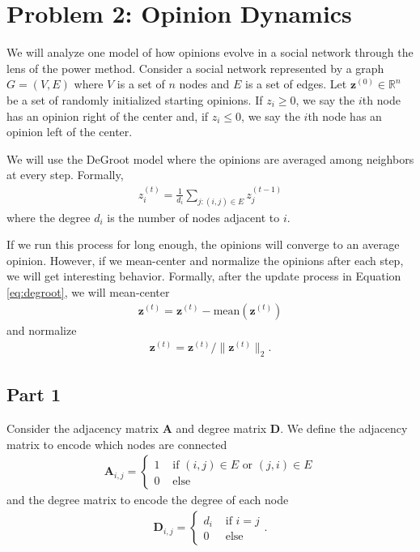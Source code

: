 \documentclass{article}
\begin{document}
\section*{Problem 2: Opinion Dynamics}

We will analyze one model of how opinions evolve in a social network through the lens of the power method.
Consider a social network represented by a graph $G = (V,E)$
where $V$ is a set of $n$ nodes and $E$ is a set of edges.
Let $\mathbf{z}^{(0)} \in \mathbb{R}^n$ be a set of randomly initialized starting opinions.
If $z_i \geq 0$, we say the $i$th node has an opinion right of the center and, if $z_i \leq 0$, we say the $i$th node has an opinion left of the center.

We will use the DeGroot model where the opinions are averaged among neighbors at every step.
Formally,
\begin{align}\label{eq:degroot}
z^{(t)}_i = \frac1{d_i} \sum_{j: (i,j) \in E} z^{(t-1)}_j
\end{align}
where the degree $d_i$ is the number of nodes adjacent to $i$.

If we run this process for long enough, the opinions will converge to an average opinion.
However, if we mean-center and normalize the opinions after each step, we will get interesting behavior.
Formally, after the update process in Equation \ref{eq:degroot}, we will mean-center
\begin{align*}
\mathbf{z}^{(t)} = \mathbf{z}^{(t)} - \text{mean}(\mathbf{z}^{(t)})
\end{align*}
and normalize
\begin{align*}
\mathbf{z}^{(t)} = \mathbf{z}^{(t)} / \|\mathbf{z}^{(t)} \|_2.
\end{align*}

\subsection*{Part 1}
Consider the adjacency matrix $\mathbf{A}$ and degree matrix $\mathbf{D}$.
We define the adjacency matrix to encode which nodes are connected
\begin{align*}
\mathbf{A}_{i,j} = \begin{cases} 1 & \text{ if }(i,j) \in E \text{ or } (j,i) \in E\\ 0 & \text{ else }
\end{cases}
\end{align*}
and the degree matrix to encode the degree of each node
\begin{align*}
\mathbf{D}_{i,j} = \begin{cases} d_i & \text{ if } i = j \\ 0 & \text{ else }
\end{cases}.
\end{align*}
\end{document}
